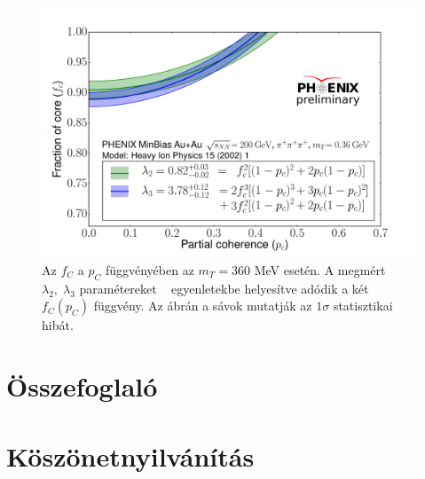 \documentclass[11pt,a4paper]{article}
\numberwithin{equation}{subsection}
\numberwithin{figure}{section}
\begin{document}
\begin{figure}[H]
\centering
\includegraphics[scale=0.5]{pic/res/fcpc2_.pdf}
\caption{Az $f_C$ a $p_C$ függvényében az $m_T=360$ MeV esetén. A megmért $\lambda_2,\;\lambda_3$ paramétereket ~ egyenletekbe helyesítve adódik a két $f_C(p_C)$ függvény. Az ábrán a sávok mutatják az $1\sigma$ statisztikai hibát.}
\label{fig:fcpc2}
\end{figure}

\section{Összefoglaló}

\section*{Köszönetnyilvánítás}



\end{document}
